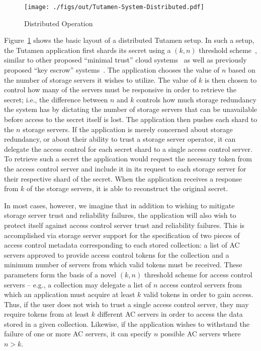 \begin{figure}[t]
  \centering
  \texttt{[image: ./figs/out/Tutamen-System-Distributed.pdf]}
  \caption{Distributed Operation}
  \label{fig:tutamen:systemdistributed}
\end{figure}

Figure~\ref{fig:tutamen:systemdistributed} shows the basic layout of a
distributed Tutamen setup. In such a setup, the Tutamen application
first shards its secret using a $(k, n)$ threshold
scheme~\cite{krawczyk1993, shamir1979}, similar to other proposed
``minimal trust'' cloud systems~\cite{bessani2011} as well as
previously proposed ``key escrow'' systems~\cite{blaze1996,
  denning1996}. The application chooses the value of $n$ based on the
number of storage servers it wishes to utilize. The value of $k$ is
then chosen to control how many of the servers must be responsive in
order to retrieve the secret; i.e., the difference between $n$ and
$k$ controls how much storage redundancy the system has by dictating
the number of storage servers that can be unavailable before access to
the secret itself is lost. The application then pushes each shard to
the $n$ storage servers. If the application is merely concerned about
storage redundancy, or about their ability to trust a storage server
operator, it can delegate the access control for each secret shard to
a single access control server. To retrieve such a secret the
application would request the necessary token from the access control
server and include it in its request to each storage server for their
respective shard of the secret. When the application receives a
response from $k$ of the storage servers, it is able to reconstruct
the original secret.

In most cases, however, we imagine that in addition to wishing to
mitigate storage server trust and reliability failures, the
application will also wish to protect itself against access control
server trust and reliability failures. This is accomplished via
storage server support for the specification of two pieces of access
control metadata corresponding to each stored collection: a list of AC
servers approved to provide access control tokens for the collection
and a minimum number of servers from which valid tokens must be
received. These parameters form the basis of a novel $(k, n)$
threshold scheme for access control servers -- e.g., a collection may
delegate a list of $n$ access control servers from which an
application must acquire at least $k$ valid tokens in order to gain
access. Thus, if the user does not wish to trust a single access
control server, they may require tokens from at least $k$ different AC
servers in order to access the data stored in a given
collection. Likewise, if the application wishes to withstand the
failure of one or more AC servers, it can specify $n$ possible AC
servers where $n > k$.

